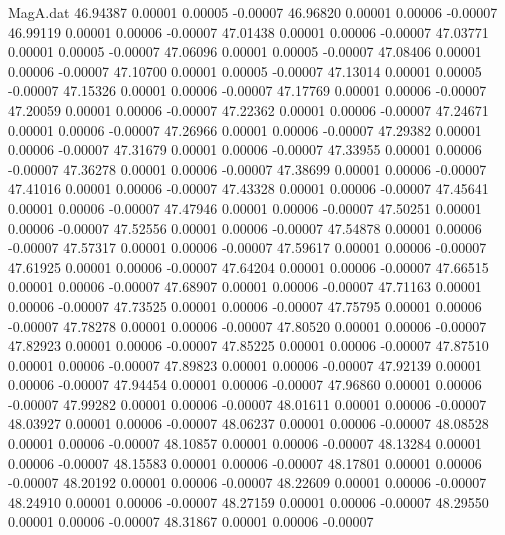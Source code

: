\begin{filecontents}{MagA.dat}
  46.94387    0.00001    0.00005   -0.00007
  46.96820    0.00001    0.00006   -0.00007
  46.99119    0.00001    0.00006   -0.00007
  47.01438    0.00001    0.00006   -0.00007
  47.03771    0.00001    0.00005   -0.00007
  47.06096    0.00001    0.00005   -0.00007
  47.08406    0.00001    0.00006   -0.00007
  47.10700    0.00001    0.00005   -0.00007
  47.13014    0.00001    0.00005   -0.00007
  47.15326    0.00001    0.00006   -0.00007
  47.17769    0.00001    0.00006   -0.00007
  47.20059    0.00001    0.00006   -0.00007
  47.22362    0.00001    0.00006   -0.00007
  47.24671    0.00001    0.00006   -0.00007
  47.26966    0.00001    0.00006   -0.00007
  47.29382    0.00001    0.00006   -0.00007
  47.31679    0.00001    0.00006   -0.00007
  47.33955    0.00001    0.00006   -0.00007
  47.36278    0.00001    0.00006   -0.00007
  47.38699    0.00001    0.00006   -0.00007
  47.41016    0.00001    0.00006   -0.00007
  47.43328    0.00001    0.00006   -0.00007
  47.45641    0.00001    0.00006   -0.00007
  47.47946    0.00001    0.00006   -0.00007
  47.50251    0.00001    0.00006   -0.00007
  47.52556    0.00001    0.00006   -0.00007
  47.54878    0.00001    0.00006   -0.00007
  47.57317    0.00001    0.00006   -0.00007
  47.59617    0.00001    0.00006   -0.00007
  47.61925    0.00001    0.00006   -0.00007
  47.64204    0.00001    0.00006   -0.00007
  47.66515    0.00001    0.00006   -0.00007
  47.68907    0.00001    0.00006   -0.00007
  47.71163    0.00001    0.00006   -0.00007
  47.73525    0.00001    0.00006   -0.00007
  47.75795    0.00001    0.00006   -0.00007
  47.78278    0.00001    0.00006   -0.00007
  47.80520    0.00001    0.00006   -0.00007
  47.82923    0.00001    0.00006   -0.00007
  47.85225    0.00001    0.00006   -0.00007
  47.87510    0.00001    0.00006   -0.00007
  47.89823    0.00001    0.00006   -0.00007
  47.92139    0.00001    0.00006   -0.00007
  47.94454    0.00001    0.00006   -0.00007
  47.96860    0.00001    0.00006   -0.00007
  47.99282    0.00001    0.00006   -0.00007
  48.01611    0.00001    0.00006   -0.00007
  48.03927    0.00001    0.00006   -0.00007
  48.06237    0.00001    0.00006   -0.00007
  48.08528    0.00001    0.00006   -0.00007
  48.10857    0.00001    0.00006   -0.00007
  48.13284    0.00001    0.00006   -0.00007
  48.15583    0.00001    0.00006   -0.00007
  48.17801    0.00001    0.00006   -0.00007
  48.20192    0.00001    0.00006   -0.00007
  48.22609    0.00001    0.00006   -0.00007
  48.24910    0.00001    0.00006   -0.00007
  48.27159    0.00001    0.00006   -0.00007
  48.29550    0.00001    0.00006   -0.00007
  48.31867    0.00001    0.00006   -0.00007

\end{filecontents}
